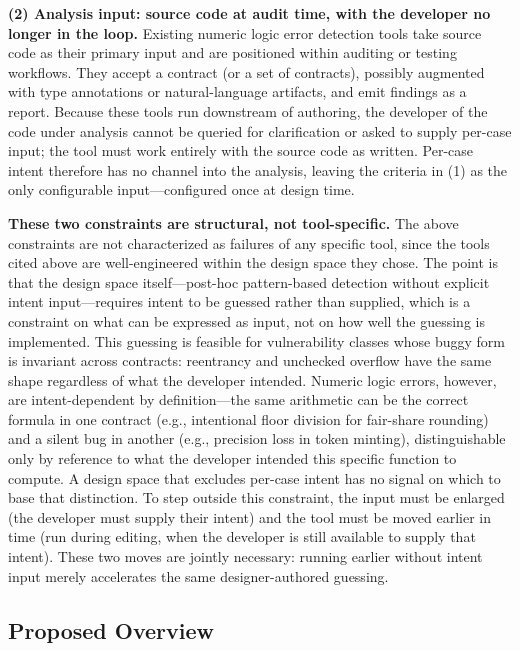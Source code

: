 \documentclass[pdflatex,sn-basic]{sn-jnl}%
\theoremstyle{thmstyleone}%
\theoremstyle{thmstyletwo}%
\theoremstyle{thmstylethree}%
\begin{document}
\smallskip
\noindent\textbf{(2) Analysis input: source code at audit time, with the developer no longer in the loop.}
Existing numeric logic error detection tools take source code as their primary input and are positioned within auditing or testing workflows.
They accept a contract (or a set of contracts), possibly augmented with type annotations or natural-language artifacts, and emit findings as a report.
Because these tools run downstream of authoring, the developer of the code under analysis cannot be queried for clarification or asked to supply per-case input; the tool must work entirely with the source code as written. Per-case intent therefore has no channel into the analysis, leaving the criteria in (1) as the only configurable input---configured once at design time.

\smallskip
\noindent\textbf{These two constraints are structural, not tool-specific.}
The above constraints are not characterized as failures of any specific tool, since the tools cited above are well-engineered within the design space they chose.
The point is that the design space itself---post-hoc pattern-based detection without explicit intent input---requires intent to be guessed rather than supplied, which is a constraint on what can be expressed as input, not on how well the guessing is implemented.
This guessing is feasible for vulnerability classes whose buggy form is invariant across contracts: reentrancy and unchecked overflow have the same shape regardless of what the developer intended.
Numeric logic errors, however, are intent-dependent by definition---the same arithmetic can be the correct formula in one contract (e.g., intentional floor division for fair-share rounding) and a silent bug in another (e.g., precision loss in token minting), distinguishable only by reference to what the developer intended this specific function to compute.
A design space that excludes per-case intent has no signal on which to base that distinction.
To step outside this constraint, the input must be enlarged (the developer must supply their intent) and the tool must be moved earlier in time (run during editing, when the developer is still available to supply that intent). These two moves are jointly necessary: running earlier without intent input merely accelerates the same designer-authored guessing.

\subsection{Proposed Overview}\label{sec:proposed-overview}
\end{document}
